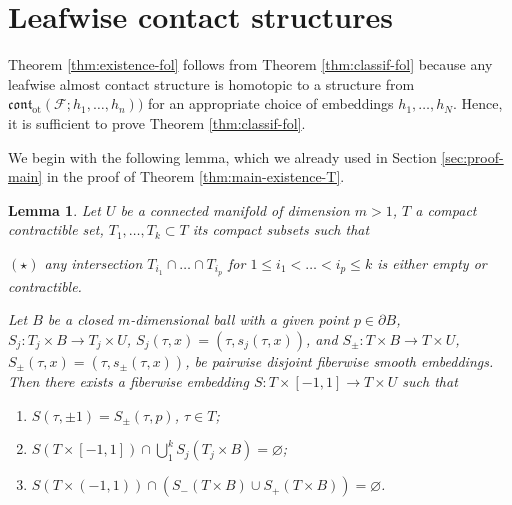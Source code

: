 \documentclass[12pt]{paper}
\theoremstyle{plain}
\newtheorem{lemma}[theorem]{Lemma}
\theoremstyle{definition}
\newcommand{\p}{\partial}
\newcommand{\cont}{\mathfrak{cont}}
\newcommand{\ot}{\mathrm{ot}}
\newcommand{\FF}{\mathcal{F}}
\numberwithin{figure}{section}
\begin{document}

\section{Leafwise contact structures}\label{sec:foliations}
\label{sec:foliations-proofs}

 Theorem \ref{thm:existence-fol} follows from  Theorem \ref{thm:classif-fol} because any leafwise almost contact structure is homotopic to a structure from $\cont_\ot(\FF;  h_1,\dots, h_n))$  for an appropriate choice of embeddings $h_1,\dots, h_N$. Hence, it is sufficient to prove Theorem  \ref{thm:classif-fol}.
 
 We begin with the following lemma, which we already  used in Section \ref{sec:proof-main} in the  proof  of Theorem \ref{thm:main-existence-T}.
  \begin{lemma}\label{lm:choosing-paths} 
    Let $U$ be a   connected manifold of dimension $m>1$,  
     $T  $   a compact contractible set,  $T_1,\dots, T_k\subset T$ its  compact    subsets  such that
     \begin{description}
     \item{$(\star)$}   any      intersection 
      $T_{i_{1}}\cap \dots \cap T_{i_{p}}$ for $1\leq i_1<\dots<i_p\leq k$
      is  either empty or contractible. 
      \end{description}
      Let $B$ be a closed $m$-dimensional ball with a given point $p \in \p B$,
         $S_j:T_j\times B\to T_j\times U$, 
        $S_j(\tau,x)=(\tau,s_j(\tau,x))$, and $S_\pm:T\times B\to T\times U$, $S_\pm(\tau,x)=(\tau,s_\pm(\tau,x))$, be pairwise disjoint fiberwise smooth embeddings.
         Then there exists a fiberwise embedding $S:T\times[-1,1]\to T\times U$  such that
     \begin{enumerate}
    \item  $S(\tau,\pm 1)=S_\pm(\tau,p)$, $\tau\in T$;
      \item $S (T\times[-1,1])\cap\bigcup\limits_1^kS_j(T_j\times B)=\varnothing$;
      \item $S (T\times(-1,1))\cap\left(S_-(T\times B)\cup S_+(T\times B)\right)=\varnothing$.
\end{enumerate}
      \end{lemma}
     
\end{document}
